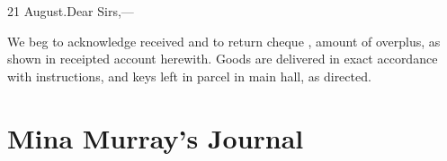 \begin{mail}{21 August.}{Dear Sirs,— }

We beg to acknowledge  received and to return cheque , amount of overplus, as shown in receipted account herewith. Goods are delivered in exact accordance with instructions, and keys left in parcel in main hall, as directed.

\begin{a4}
	\enlargethispage{\baselineskip}
\end{a4}

\end{mail}

\section{Mina Murray's Journal}

